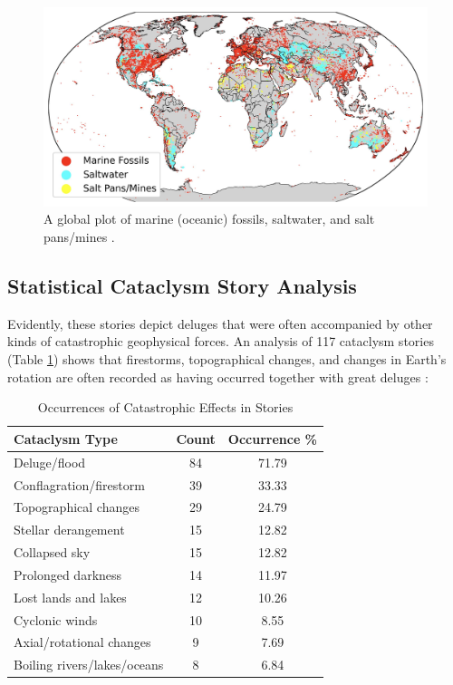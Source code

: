 \documentclass[10pt,twocolumn,letterpaper]{article}
\begin{document}
\begin{figure}[b]
\begin{center}
\includegraphics[width=1\textwidth]{marine.jpg}
\end{center}
   \caption{A global plot of marine (oceanic) fossils, saltwater, and salt pans/mines \cite{15,16,86,87}.}
   \label{fig:2}
\end{figure}

\subsection{Statistical Cataclysm Story Analysis}

Evidently, these stories depict deluges that were often accompanied by other kinds of catastrophic geophysical forces. An analysis of 117 cataclysm stories (Table \ref{tab: 1}) shows that firestorms, topographical changes, and changes in Earth's rotation are often recorded as having occurred together with great deluges \cite{14}:

\begin{table}[ht]
\begin{center}
\renewcommand{\arraystretch}{1.2}  %
\begin{tabular}{|l|c|c|}
\hline
\textbf{Cataclysm Type} & \textbf{Count} & \textbf{Occurrence \%} \\
\hline\hline
Deluge/flood            & 84 & 71.79 \\
Conflagration/firestorm & 39 & 33.33 \\
Topographical changes   & 29 & 24.79 \\
Stellar derangement     & 15 & 12.82 \\
Collapsed sky           & 15 & 12.82 \\
Prolonged darkness      & 14 & 11.97 \\
Lost lands and lakes    & 12 & 10.26 \\
Cyclonic winds          & 10 & 8.55  \\
Axial/rotational changes & 9 & 7.69  \\
Boiling rivers/lakes/oceans & 8 & 6.84 \\
\hline
\end{tabular}
\end{center}
\caption{Occurrences of Catastrophic Effects in Stories}
\label{tab: 1}
\end{table}
\end{document}
